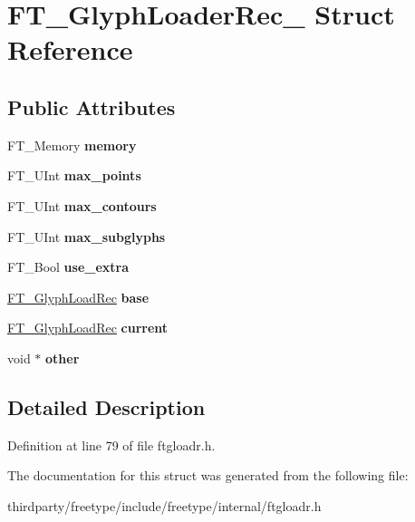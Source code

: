 \hypertarget{struct_f_t___glyph_loader_rec__}{}\section{F\+T\+\_\+\+Glyph\+Loader\+Rec\+\_\+ Struct Reference}
\label{struct_f_t___glyph_loader_rec__}
\subsection*{Public Attributes}
\begin{DoxyCompactItemize}
\item 
\mbox{\label{struct_f_t___glyph_loader_rec___a9120a7808ee59d24dd52409e609907a2}} 
F\+T\+\_\+\+Memory {\bfseries memory}
\item 
\mbox{\label{struct_f_t___glyph_loader_rec___a62339fa7a06e0b4ddecd5db2aa606741}} 
F\+T\+\_\+\+U\+Int {\bfseries max\+\_\+points}
\item 
\mbox{\label{struct_f_t___glyph_loader_rec___a808ccf46597572d953f387e705f10a36}} 
F\+T\+\_\+\+U\+Int {\bfseries max\+\_\+contours}
\item 
\mbox{\label{struct_f_t___glyph_loader_rec___a2d5b00d7caf624ed2b4f6fd2db3228db}} 
F\+T\+\_\+\+U\+Int {\bfseries max\+\_\+subglyphs}
\item 
\mbox{\label{struct_f_t___glyph_loader_rec___a54009985acda32d83f2f124e28c5d00a}} 
F\+T\+\_\+\+Bool {\bfseries use\+\_\+extra}
\item 
\mbox{\label{struct_f_t___glyph_loader_rec___ae80dfc17f20bfce8c60ffaaba95c821b}} 
\hyperlink{struct_f_t___glyph_load_rec__}{F\+T\+\_\+\+Glyph\+Load\+Rec} {\bfseries base}
\item 
\mbox{\label{struct_f_t___glyph_loader_rec___a271b1b9604746ed08cf6613710ebb4c1}} 
\hyperlink{struct_f_t___glyph_load_rec__}{F\+T\+\_\+\+Glyph\+Load\+Rec} {\bfseries current}
\item 
\mbox{\label{struct_f_t___glyph_loader_rec___a9c58c5b06f0135fe5cef16bd85d939e3}} 
void $\ast$ {\bfseries other}
\end{DoxyCompactItemize}


\subsection{Detailed Description}


Definition at line 79 of file ftgloadr.\+h.



The documentation for this struct was generated from the following file\+:\begin{DoxyCompactItemize}
\item 
thirdparty/freetype/include/freetype/internal/ftgloadr.\+h\end{DoxyCompactItemize}
